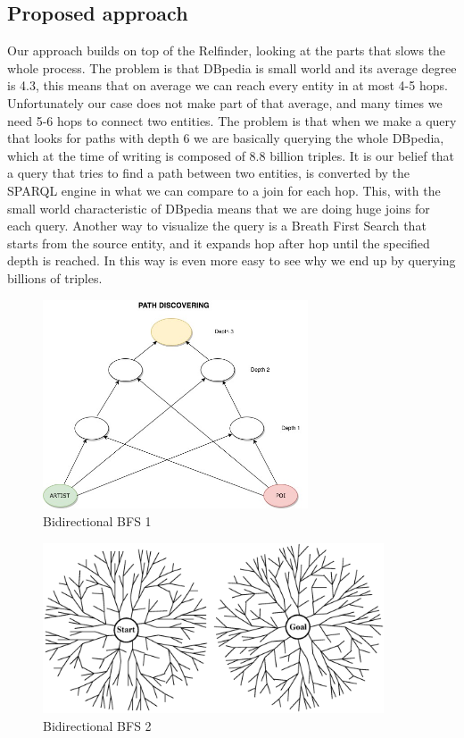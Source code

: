 \documentclass[paper=a4, fontsize=11pt]{scrartcl}
\begin{document}
\subsection{Proposed approach}
Our approach builds on top of the Relfinder, looking at the parts that slows the whole process. 
The problem is that DBpedia is small world and its average degree is 4.3, this means that on average we can reach every entity in at most 4-5 hops. Unfortunately our case does not make part of that average, and many times we need 5-6 hops to connect two entities. The problem is that when we make a query that looks for paths with depth 6 we are basically querying the whole DBpedia, which at the time of writing is composed of 8.8 billion triples.
It is our belief that a query that tries to find a path between two entities, is converted by the SPARQL engine in what we can compare to a join for each hop. This, with the small world characteristic of DBpedia means that we are doing huge joins for each query.
Another way to visualize the query is a Breath First Search that starts from the source entity, and it expands hop after hop until the specified depth is reached. In this way is even more easy to see why we end up by querying billions of triples.


\begin{figure}[!htb]
  \centering 
    \includegraphics[width=0.7\textwidth]{images/Path_Discovering.jpg}
    \caption{Bidirectional BFS 1}
\end{figure}

\begin{figure}[!htb]
  \centering 
    \includegraphics[width=0.9\textwidth]{images/bfs.png}
    \caption{Bidirectional BFS 2 \cite{artificial_intelligence}}
\end{figure}
\end{document}
